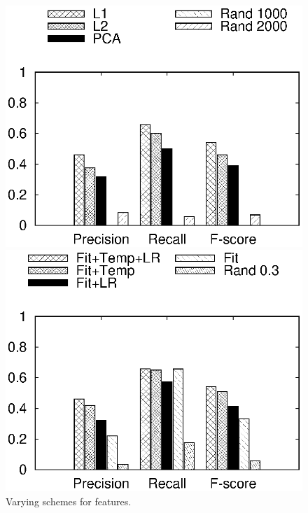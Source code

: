 
\begin{figure}[ht]
    \begin{minipage}{\figurewidthE}%
        \centering
        \includegraphics[width=\figurewidthE]{Figs/identify.eps}
        \caption{\small{Varying schemes for features.}}
        \label{fig:identify}
    \end{minipage}
    \begin{minipage}{\figurewidthE}%
        \centering
        \includegraphics[width=\figurewidthE]{Figs/regression.eps}

\end{minipage}
\end{figure}

